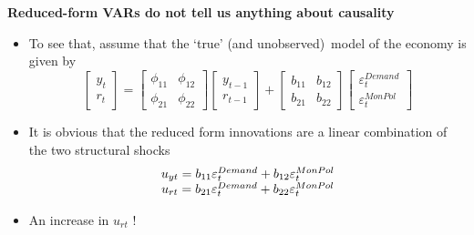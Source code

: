 \documentclass[10pt,english,t,aspectratio=169,ignorenonframetext]{beamer}
\begin{document}
\begin{frame}
{\textbf{Reduced-form VARs do not tell us anything about causality}}

\begin{itemize}
\item To see that, assume that the `true' (and unobserved)\ model of the
economy is given by%
\begin{equation*}
\begin{bmatrix}
y_{t} \\ 
r_{t}%
\end{bmatrix}%
=\left[ 
\begin{array}{cc}
\phi _{11} & \phi _{12} \\ 
\phi _{21} & \phi _{22}%
\end{array}%
\right] 
\begin{bmatrix}
y_{t-1} \\ 
r_{t-1}%
\end{bmatrix}%
+\left[ 
\begin{array}{cc}
b_{11} & b_{12} \\ 
b_{21} & b_{22}%
\end{array}%
\right] 
\begin{bmatrix}
\varepsilon _{t}^{Demand} \\ 
\varepsilon _{t}^{MonPol}%
\end{bmatrix}%
\end{equation*}
\pause

\item It is obvious that the reduced form innovations are a linear
combination of the two structural shocks%
\begin{equation*}
\begin{array}{c}
u_{yt}=b_{11}\varepsilon _{t}^{Demand}+b_{12}\varepsilon _{t}^{MonPol}{%
\mathbf{\medskip }} \\ 
u_{rt}=b_{21}\varepsilon _{t}^{Demand}+b_{22}\varepsilon _{t}^{MonPol}%
\end{array}%
\end{equation*}%
\pause

\item An increase in $u_{rt}$ {%
}!%
\end{itemize}
\end{frame}
\end{document}

